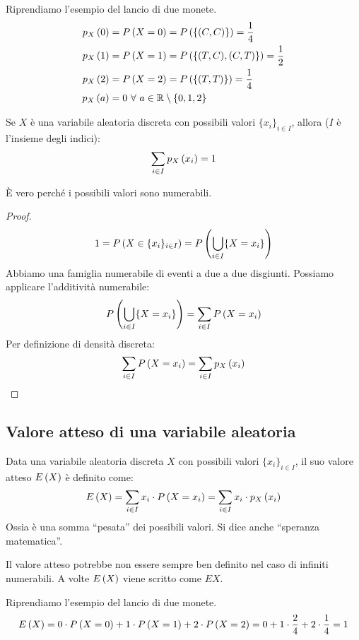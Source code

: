 Riprendiamo l'esempio del lancio di due monete. 
\begin{align*}
\mass{0} &= \prob{X = 0} = \prob{\{(C,C)\}} = \frac{1}{4} \\
\mass{1} &= \prob{X = 1} = \prob{\{(T,C), (C,T)\}} = \frac{1}{2} \\
\mass{2} &= \prob{X = 2} = \prob{\{(T,T)\}} = \frac{1}{4} \\
\mass{a} &= 0 \forall a \in \reals \setminus \{0, 1, 2\}
\end{align*}
\begin{prop}
Se $X$ \`e una variabile aleatoria discreta con possibili valori $\{x_i\}_{i \in I}$, allora ($I$ \`e l'insieme degli indici):
\[
\sum_{i \in I} p_{X} \left( x_i \right) = 1
\]
\end{prop}
\`E vero perch\'e i possibili valori sono numerabili.
\begin{proof}
\[
1 = P \left( {X \in \{x_i\}_{i \in I}} \right) = P \left( {\bigcup_{i \in I} \{X = x_i\}} \right)
\]
Abbiamo una famiglia numerabile di eventi a due a due disgiunti. Possiamo applicare l'additivit\`a numerabile:
\[
P \left( {\bigcup_{i \in I} \{X = x_i\}} \right) = \sum_{i \in I} P \left( {X = x_i} \right)
\]
Per definizione di densit\`a discreta:
\[
\sum_{i \in I} P \left( {X = x_i} \right) = \sum_{i \in I} p_{X} \left( x_i \right)
\]
\end{proof}

\subsection{Valore atteso di una variabile aleatoria}
\begin{defn}
Data una variabile aleatoria discreta $X$ con possibili valori $\{x_i\}_{i \in I}$, il suo valore atteso $E \left( X \right)$ \`e definito come:
\[
E \left( X \right) = \sum_{i \in I} x_i \cdot P \left( {X = x_i} \right) = \sum_{i \in I} x_i \cdot p_{X} \left( x_i \right)
\]
Ossia \`e una somma ``pesata'' dei possibili valori. Si dice anche ``speranza matematica''.
\end{defn}
Il valore atteso potrebbe non essere sempre ben definito nel caso di infiniti numerabili. A volte $E \left( X \right)$ viene scritto come $E X$.

Riprendiamo l'esempio del lancio di due monete.
\[
E \left( X \right) = 0 \cdot P \left( {X = 0} \right) + 1 \cdot P \left( {X = 1} \right) + 2 \cdot P \left( {X = 2} \right) =
0 + 1 \cdot \frac{2}{4} + 2 \cdot \frac{1}{4} = 1
\]

